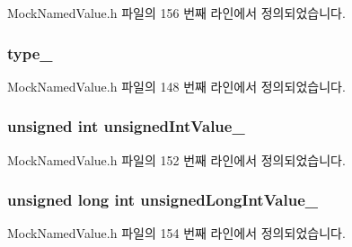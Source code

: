 Mock\+Named\+Value.\+h 파일의 156 번째 라인에서 정의되었습니다.

\subsubsection[{\texorpdfstring{type\+\_\+}{type_}}]{ type\+\_\+\hspace{0.3cm}{\ttfamily [private]}}\hypertarget{class_mock_named_value_ad41f1c1c681fbfc6ba0ef62ac34ac075}{}\label{class_mock_named_value_ad41f1c1c681fbfc6ba0ef62ac34ac075}


Mock\+Named\+Value.\+h 파일의 148 번째 라인에서 정의되었습니다.

\subsubsection[{\texorpdfstring{unsigned\+Int\+Value\+\_\+}{unsignedIntValue_}}]{\setlength{\rightskip}{0pt plus 5cm}unsigned int unsigned\+Int\+Value\+\_\+}\hypertarget{class_mock_named_value_ac7bbeb1249238a3f9c83854c5794a19b}{}\label{class_mock_named_value_ac7bbeb1249238a3f9c83854c5794a19b}


Mock\+Named\+Value.\+h 파일의 152 번째 라인에서 정의되었습니다.

\subsubsection[{\texorpdfstring{unsigned\+Long\+Int\+Value\+\_\+}{unsignedLongIntValue_}}]{\setlength{\rightskip}{0pt plus 5cm}unsigned long int unsigned\+Long\+Int\+Value\+\_\+}\hypertarget{class_mock_named_value_ab8e3b434b1b928416e2b0ff65f054869}{}\label{class_mock_named_value_ab8e3b434b1b928416e2b0ff65f054869}


Mock\+Named\+Value.\+h 파일의 154 번째 라인에서 정의되었습니다.

